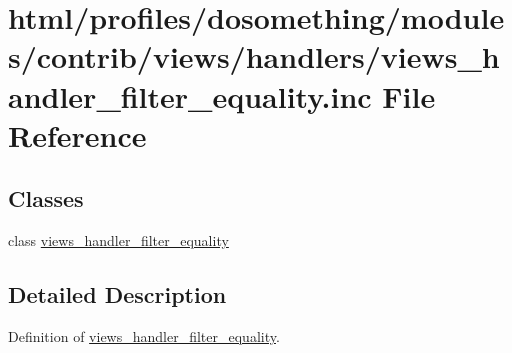 \hypertarget{views__handler__filter__equality_8inc}{
\section{html/profiles/dosomething/modules/contrib/views/handlers/views\_\-handler\_\-filter\_\-equality.inc File Reference}
\label{views__handler__filter__equality_8inc}
}
\subsection*{Classes}
\begin{DoxyCompactItemize}
\item 
class \hyperlink{classviews__handler__filter__equality}{views\_\-handler\_\-filter\_\-equality}
\end{DoxyCompactItemize}


\subsection{Detailed Description}
Definition of \hyperlink{classviews__handler__filter__equality}{views\_\-handler\_\-filter\_\-equality}. 